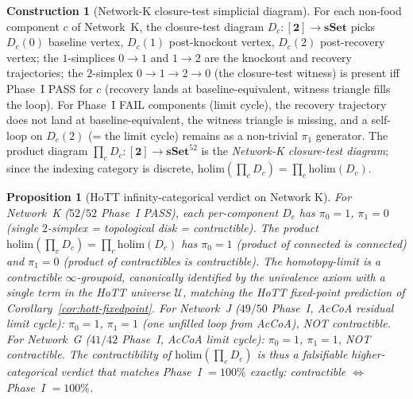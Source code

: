 \documentclass[11pt,a4paper]{article}
\theoremstyle{plain}
\newtheorem{proposition}[theorem]{Proposition}
\theoremstyle{definition}
\newtheorem{construction}[theorem]{Construction}
\theoremstyle{remark}
\begin{document}
\begin{construction}[Network-K closure-test simplicial diagram]
\label{con:netK-closure-diagram}
For each non-food component $c$ of Network~K, the closure-test
diagram $D_c : [\mathbf{2}] \to \mathbf{sSet}$ picks $D_c(0)$
baseline vertex, $D_c(1)$ post-knockout vertex, $D_c(2)$ post-recovery
vertex; the $1$-simplices $0 \to 1$ and $1 \to 2$ are the knockout
and recovery trajectories; the $2$-simplex $0 \to 1 \to 2 \to 0$
(the closure-test witness) is present iff Phase~I PASS for $c$
(recovery lands at baseline-equivalent, witness triangle fills the
loop). For Phase~I FAIL components (limit cycle), the recovery
trajectory does not land at baseline-equivalent, the witness
triangle is missing, and a self-loop on $D_c(2)$ (= the limit cycle)
remains as a non-trivial $\pi_1$ generator. The product diagram
$\prod_c D_c : [\mathbf{2}] \to \mathbf{sSet}^{52}$ is the
\emph{Network-K closure-test diagram}; since the indexing category
is discrete, $\mathrm{holim}(\prod_c D_c) = \prod_c \mathrm{holim}(D_c)$.
\end{construction}

\begin{proposition}[HoTT infinity-categorical verdict on Network K]
\label{prop:netK-hott}
For Network~K ($52/52$ Phase~I PASS), each per-component $D_c$ has
$\pi_0 = 1$, $\pi_1 = 0$ (single $2$-simplex = topological disk =
contractible). The product $\mathrm{holim}(\prod_c D_c) = \prod_c
\mathrm{holim}(D_c)$ has $\pi_0 = 1$ (product of connected is
connected) and $\pi_1 = 0$ (product of contractibles is
contractible). The homotopy-limit is a contractible
$\infty$-groupoid, canonically identified by the univalence axiom
with a single term in the HoTT universe $\mathcal{U}$, matching the
HoTT fixed-point prediction of Corollary~\ref{cor:hott-fixedpoint}.
For Network~J ($49/50$ Phase~I, AcCoA residual limit cycle): $\pi_0
= 1$, $\pi_1 = 1$ (one unfilled loop from AcCoA), NOT contractible.
For Network~G ($41/42$ Phase~I, AcCoA limit cycle): $\pi_0 = 1$,
$\pi_1 = 1$, NOT contractible. The contractibility of
$\mathrm{holim}(\prod_c D_c)$ is thus a falsifiable higher-categorical
verdict that matches Phase~I $= 100\%$ exactly: contractible
$\Longleftrightarrow$ Phase~I $= 100\%$.
\end{proposition}
\end{document}
